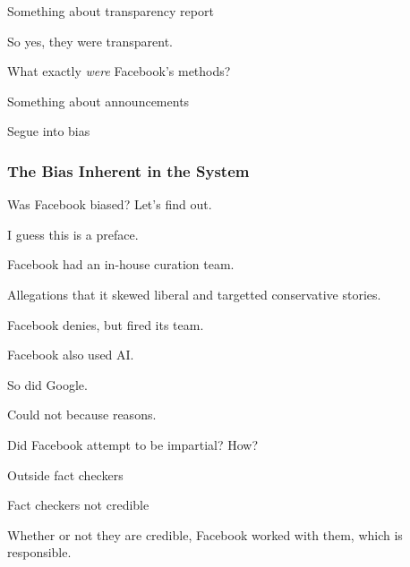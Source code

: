 \par Something about transparency report \cite{fb_info_ops}

\par So yes, they were transparent.


\par What exactly \emph{were} Facebook's methods?

\par Something about announcements

\par Segue into bias

\subsubsection{The Bias Inherent in the System}

\par Was Facebook biased? Let's find out.


\par I guess this is a preface.


\par Facebook had an in-house curation team.
\par Allegations that it skewed liberal and targetted conservative stories.
\par Facebook denies, but fired its team. \cite{tc_ai}


\par Facebook also used AI. \cite{tc_ai}

\par So did Google.

\par Could not because reasons. \cite{ai_cannot_win}


\par Did Facebook attempt to be impartial? How?

\par Outside fact checkers \cite{tc_downranks}

\par Fact checkers not credible \cite{vox_sentences}

\par Whether or not they are credible, Facebook worked with them, which is responsible.

